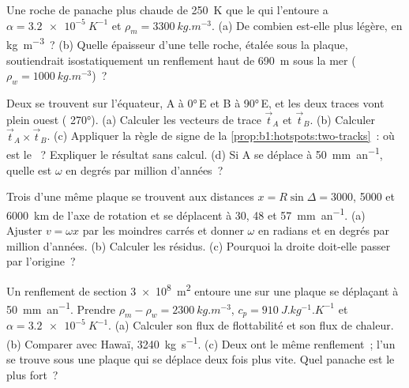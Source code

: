 \begin{exercise}[$\star$]\label{exo:b1:hotspots:4}
Une roche de panache plus chaude de \qty{250}{K} que le  qui l'entoure a
$\alpha = \qty{3.2e-5}{K^{-1}}$ et $\rho_m = \qty{3300}{kg.m^{-3}}$. (a) De combien
est-elle plus légère, en \unit{kg.m^{-3}}~? (b) Quelle épaisseur d'une telle roche,
étalée sous la plaque, soutiendrait isostatiquement un renflement haut de \qty{690}{m}
sous la mer ($\rho_w = \qty{1000}{kg.m^{-3}}$)~?
\end{exercise}

\begin{exercise}[$\star\star$]\label{exo:b1:hotspots:5}
Deux  se trouvent sur l'équateur, A à \ang{0}\,E et B à \ang{90}\,E, et
les deux traces vont plein ouest ( \ang{270}). (a) Calculer les vecteurs de trace
$\vec t_A$ et $\vec t_B$. (b) Calculer $\vec t_A\times\vec t_B$. (c) Appliquer la
règle de signe de la \cref{prop:b1:hotspots:two-tracks}~: où est le ~?
Expliquer le résultat sans calcul. (d) Si A se déplace à \qty{50}{mm.an^{-1}},
quelle est $\omega$ en degrés par million d'années~?
\end{exercise}

\begin{exercise}[$\star\star$]\label{exo:b1:hotspots:6}
Trois  d'une même plaque se trouvent aux distances $x = R\sin\Delta = 3000$, 5000
et \qty{6000}{km} de l'axe de rotation et se déplacent à 30, 48 et
\qty{57}{mm.an^{-1}}. (a) Ajuster $v = \omega x$ par les moindres carrés et donner
$\omega$ en radians et en degrés par million d'années. (b) Calculer les
résidus. (c) Pourquoi la droite doit-elle passer par l'origine~?
\end{exercise}

\begin{exercise}[$\star\star$]\label{exo:b1:hotspots:7}
Un renflement de section \qty{3e8}{m^2} entoure une  sur une plaque
se déplaçant à \qty{50}{mm.an^{-1}}. Prendre $\rho_m - \rho_w = \qty{2300}{kg.m^{-3}}$,
$c_p = \qty{910}{J.kg^{-1}.K^{-1}}$ et $\alpha = \qty{3.2e-5}{K^{-1}}$. (a)
Calculer son flux de flottabilité et son flux de chaleur. (b) Comparer avec Hawaï,
\qty{3240}{kg.s^{-1}}. (c) Deux  ont le même renflement~; l'un se trouve sous une
plaque qui se déplace deux fois plus vite. Quel panache est le plus fort~?
\end{exercise}

